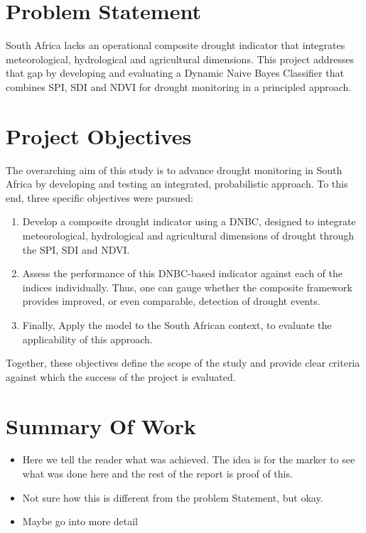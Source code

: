 \section{Problem Statement}

South Africa lacks an operational composite drought indicator that integrates meteorological, hydrological and agricultural dimensions. This project addresses that gap by developing and evaluating a Dynamic Naive Bayes Classifier that combines SPI, SDI and NDVI for drought monitoring in a principled approach.

\section{Project Objectives}

The overarching aim of this study is to advance drought monitoring in South Africa by developing and testing an integrated, probabilistic approach. To this end, three specific objectives were pursued:
\begin{enumerate}
    \item Develop a composite drought indicator using a DNBC, designed to integrate meteorological, hydrological and agricultural dimensions of drought through the SPI, SDI and NDVI. 
    \item Assess the performance of this DNBC-based indicator against each of the indices individually. Thus, one can gauge whether the composite framework provides improved, or even comparable, detection of drought events. 
    \item Finally, Apply the model to the South African context, to evaluate the applicability of this approach. \end{enumerate}

Together, these objectives define the scope of the study and provide clear criteria against which the success of the project is evaluated.

\section{Summary Of Work}

\begin{itemize}
    \item Here we tell the reader what was achieved. The idea is for the marker to see what was done here and the rest of the report is proof of this. 
    \item Not sure how this is different from the problem Statement, but okay.
    \item Maybe go into more detail
\end{itemize}

